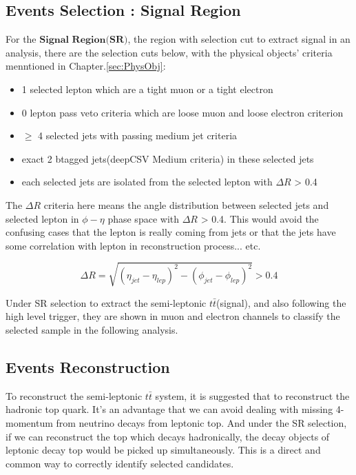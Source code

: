 
	\subsection{Events Selection : Signal Region}
	\label{ssec:EvtSel_SR}

		For the $\textbf{Signal Region(SR)}$, the region with selection cut to extract signal in an analysis, there are the selection cuts below, with the physical objects' criteria menntioned in Chapter.\ref{sec:PhysObj}:

		\begin{itemize}
	  		\item 1 selected lepton which are a tight muon or a tight electron
	  		\item 0 lepton pass veto criteria which are loose muon and loose electron criterion
	  		\item $\geq$ 4 selected jets with passing medium jet criteria
	  		\item exact 2 btagged jets(deepCSV Medium criteria) in these selected jets
	  		\item each selected jets are isolated from the selected lepton with $\Delta R$ > 0.4
	  	\label{EventSelReco:itm:full_sel}
		\end{itemize}

		The $\Delta R$ criteria here means the angle distribution between selected jets and selected lepton in $\phi - \eta$ phase space with $\Delta R$ > 0.4. This would avoid the confusing cases that the lepton is really coming from jets or that the jets have some correlation with lepton in reconstruction process... etc.

		\begin{equation}
		\Delta R = \sqrt{ (\eta_{jet} - \eta_{lep})^2 - (\phi_{jet} - \phi_{lep})^2 } > 0.4
		\end{equation}

		Under SR selection to extract the semi-leptonic $t\bar{t}$(signal), and also following the high level trigger, they are shown in muon and electron channels to classify the selected sample in the following analysis.

	\subsection{Events Reconstruction}
	\label{ssec:EvtReco}

		To reconstruct the semi-leptonic $t\bar{t}$ system, it is suggested that to reconstruct the hadronic top quark. It's an advantage that we can avoid dealing with missing 4-momentum from neutrino decays from leptonic top. And under the SR selection, if we can reconstruct the top which decays hadronically, the decay objects of leptonic decay top would be picked up simultaneously. This is a direct and common way to correctly identify selected candidates.

